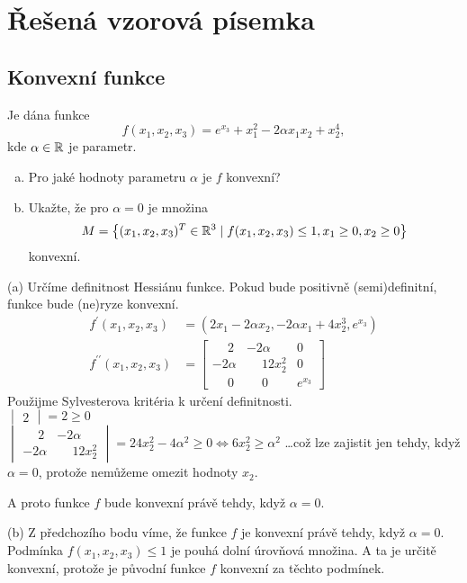 \section{Řešená vzorová písemka}

\subsection{Konvexní funkce}
Je dána funkce
\[
    f(x_1, x_2, x_3) = e^{x_3} + x_1^2 - 2 \alpha x_1x_2 + x_2^4,
\]
kde $\alpha \in \mathbb{R}$ je parametr.
\begin{enumerate}[(a)]
    \item Pro jaké hodnoty parametru $\alpha$ je $f$ konvexní?
    \item Ukažte, že pro $\alpha = 0$ je množina
    \[
        M = \left\lbrace (x_1, x_2, x_3)^T \in \mathbb{R}^3 \mid f(x_1, x_2, x_3) \leq 1, x_1 \geq 0, x_2 \geq 0 \right\rbrace
    \]
    konvexní.
\end{enumerate}

(a) Určíme definitnost Hessiánu funkce. Pokud bude positivně (semi)definitní, funkce bude (ne)ryze konvexní.
\begin{align*}
    f^\prime (x_1, x_2, x_3) &= \left(2x_1 - 2\alpha x_2, -2\alpha x_1 + 4 x_2^3, e^{x_3}\right) \\
    f^{\prime \prime}(x_1, x_2, x_3) &= 
    \begin{bmatrix}
        \phantom{-}2 & -2\alpha & 0 \\
        -2\alpha & \phantom{-}12x_2^2 & 0 \\
        \phantom{-}0 & \phantom{-}0 & e^{x_3}    
    \end{bmatrix}
\end{align*}
Použijme Sylvesterova kritéria k určení definitnosti.\\
$\begin{vmatrix}2\end{vmatrix} = 2 \geq 0$\\
$\begin{vmatrix}
    \phantom{-}2 & -2\alpha \\
    -2\alpha & \phantom{-}12x_2^2
\end{vmatrix} = 24x_2^2 - 4\alpha^2 \geq 0 \iff 6x_2^2 \geq \alpha^2$ \dots což lze zajistit jen tehdy, když $\alpha=0$,
protože nemůžeme omezit hodnoty $x_2$.

A proto funkce $f$ bude konvexní právě tehdy, když $\alpha = 0$.

(b) Z předchozího bodu víme, že funkce $f$ je konvexní právě tehdy, když $\alpha = 0$. \\ Podmínka 
$f(x_1, x_2, x_3) \leq 1$ je pouhá dolní úrovňová množina. A ta je určitě konvexní, protože je původní funkce $f$ 
konvexní za těchto podmínek. 

